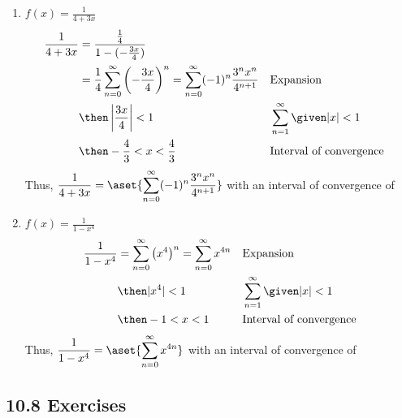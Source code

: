 \begin{enumerate}[itemsep=24em, resume]
  \item  \(\displaystyle f(x) = \frac{1}{4+3x} \)
    \begin{align*}
      \frac{1}{4+3x} &= \frac{\frac{1}{4}}{1 - (-\frac{3x}{4})} \\
      &= \frac{1}{4} \sum_{n=0}^{\infty} \left( -\frac{3x}{4} \right)^n
      = \sum_{n=0}^{\infty} (-1)^n \frac{3^nx^n}{4^{n+1} }
      && \text{Expansion} \\
      &\then \left| \frac{3x}{4} \right| < 1
      && \sum_{n=1}^{\infty} \given |x| < 1 \\
      &\then -\frac{4}{3} < x < \frac{4}{3}
      && \text{Interval of convergence}
    \end{align*}
    Thus, \(\displaystyle \frac{1}{4+3x} =
    \aset{\sum_{n=0}^{\infty} (-1)^n \frac{3^nx^n}{4^{n+1}}} \)
    with an interval of convergence of

  \vspace{-16em}
  \item  \(\displaystyle f(x) = \frac{1}{1-x^4} \)
    \begin{align*}
      \frac{1}{1-x^4} &= \sum_{n=0}^{\infty} \left( x^4 \right)^n
      = \sum_{n=0}^{\infty} x^{4n}
      && \text{Expansion} \\
      &\then |x^4| < 1
      && \sum_{n=1}^{\infty} \given |x| < 1 \\
      &\then -1 < x < 1
      && \text{Interval of convergence}
    \end{align*}
    Thus, \(\displaystyle \frac{1}{1-x^4} =
    \aset{\sum_{n=0}^{\infty} x^{4n}}  \)
    with an interval of convergence of
\end{enumerate}

\newpage %

\subsection{10.8 Exercises}

